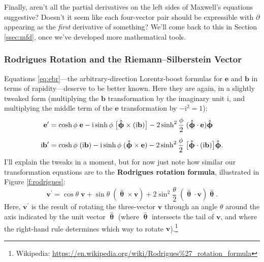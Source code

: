 \documentclass[12pt]{article}
\renewcommand{\vv}[1]{\mathbf{#1}}
\newcommand{\hatphi}{\bm{\hat{\upphi}}}
\begin{document}
Finally, aren't all the partial derivatives on the left sides of Maxwell's equations suggestive? Doesn't it seem like each four-vector pair should be expressible with $\partialup$ appearing as the \emph{first} derivative of something? We'll come back to this in Section \ref{ssec:mfd}, once we've developed more mathematical tools.


\subsubsection{Rodrigues Rotation and the Riemann--Silberstein Vector}\label{sssec:rsv}

Equations \ref{eq:ebr}---the arbitrary-direction Lorentz-boost formulas for $\vv e$ and $\vv b$ in terms of rapidity---deserve to be better known. Here they are again, in a slightly tweaked form (multiplying the $\vv b$ transformation by the imaginary unit $\textrm{i}$, and multiplying the middle term of the $\vv e$ transformation by $- \textrm{i}^2 = 1$):
\begin{equation}\label{eq:tebr}
\begin{aligned}
\vv e^\prime &= \cosh{\phi} \; \vv e - \textrm{i} \sinh{\phi} \; \big[ \hatphi \times (\textrm i \vv b) \big] - 2 \sinh^2 \frac{\phi}{2} \; (\hatphi \cdot \vv e) \hatphi \\[4pt]
\textrm{i} \vv b^\prime &= \cosh{\phi} \; (\textrm{i} \vv b) - \textrm{i} \sinh{\phi} \; (\hatphi \times \vv e) - 2 \sinh^2 \frac{\phi}{2} \; \big[ \hatphi \cdot (\textrm{i} \vv b) \big] \hatphi .
\end{aligned}
\end{equation}
I'll explain the tweaks in a moment, but for now just note how similar our transformation equations are to the \textbf{Rodrigues rotation formula}, illustrated in Figure \ref{f:rodrigues}:
\begin{equation}\label{eq:rodrigues}
\vv v^\prime = \cos \theta \; \vv v + \sin \theta \; ( \vv{\hat{\uptheta}} \times \vv v ) + 2 \sin^2 \frac{\theta}{2} \; (\vv{\hat{\uptheta}} \cdot \vv v) \vv{\hat{\uptheta}} .
\end{equation}
Here, $\vv v^\prime$ is the result of rotating the three-vector $\vv v$ through an angle $\theta$ around the axis indicated by the unit vector $\vv{\hat{\uptheta}}$ (where $\vv{\hat{\uptheta}}$ intersects the tail of $\vv v$, and where the right-hand rule determines which way to rotate $\vv v$).\footnote{Wikipedia: \url{https://en.wikipedia.org/wiki/Rodrigues\%27_rotation_formula}}
\end{document}
